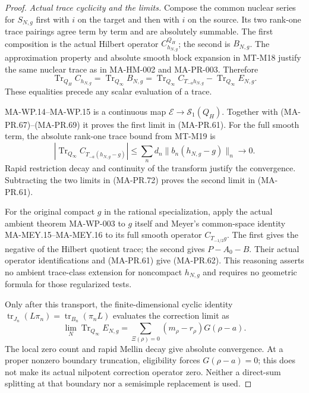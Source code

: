 \begin{proof}
\emph{Actual trace cyclicity and the limits.}
Compose the common nuclear series for \(S_{N,g}\)
first with \(i\) on the target and then with \(i\)
on the source.  Its two rank-one trace pairings agree
term by term and are absolutely summable.
The first composition is the actual Hilbert operator
\(C_{h_{N,g}}^{Q_H}\); the second is \(B_{N,g}\).
The approximation property and absolute smooth block
expansion in MT-M18 justify the same nuclear trace
as in MA-HM-002 and MA-PR-003.  Therefore
\[
 \operatorname{Tr}_{Q_H}C_{h_{N,g}}
    =\operatorname{Tr}_{Q_\infty}B_{N,g}
    =\operatorname{Tr}_{Q_\infty}C_{T_{-a}h_{N,g}}
                       -\operatorname{Tr}_{Q_\infty}E_{N,g}.
 \tag{MA-PR.72}
\]
These equalities precede any scalar evaluation of a trace.

MA-WP.14--MA-WP.15 is a continuous map
\(\mathcal E\to\mathcal S_1(Q_H)\).
Together with (MA-PR.67)--(MA-PR.69) it proves
the first limit in (MA-PR.61).
For the full smooth term, the absolute rank-one trace
bound from MT-M19 is
\[
 \left|\operatorname{Tr}_{Q_\infty}
                   C_{T_{-a}(h_{N,g}-g)}\right|
 \le\sum_n d_n\|b_n(h_{N,g}-g)\|_n\longrightarrow0 .
 \tag{MA-PR.73}
\]
Rapid restriction decay and continuity of the transform
justify the convergence.  Subtracting the two limits
in (MA-PR.72) proves the second limit in (MA-PR.61).

For the original compact \(g\) in the rational
specialization, apply the actual ambient theorem
MA-WP-003 to \(g\) itself and Meyer's common-space
identity MA-MEY.15--MA-MEY.16 to its full smooth
operator \(C_{T_{-1/2}g}\).
The first gives the negative of the Hilbert quotient
trace; the second gives \(P-A_0-B\).
Their actual operator identifications and (MA-PR.61)
give (MA-PR.62).
This reasoning asserts no ambient trace-class
extension for noncompact \(h_{N,g}\) and requires
no geometric formula for those regularized tests.

Only after this transport, the finite-dimensional
cyclic identity
\(\operatorname{tr}_{J_n}(L\pi_n)
 =\operatorname{tr}_{B_n}(\pi_nL)\)
evaluates the correction limit as
\[
 \lim_N\operatorname{Tr}_{Q_\infty}E_{N,g}
          =\sum_{\Xi(\rho)=0}
              (m_\rho-r_\rho)G(\rho-a).
 \tag{MA-PR.74}
\]
The local zero count and rapid Mellin decay give
absolute convergence.  At a proper nonzero
boundary truncation, eligibility forces \(G(\rho-a)=0\);
this does not make its actual nilpotent correction
operator zero.  Neither a direct-sum splitting
at that boundary nor a semisimple replacement is used.
\end{proof}

